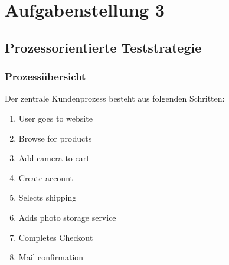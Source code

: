 \newpage
\section{Aufgabenstellung 3}




\subsection{Prozessorientierte Teststrategie}
\subsubsection{Prozessübersicht}
Der zentrale Kundenprozess besteht aus folgenden Schritten:
\begin{enumerate}
\item User goes to website
\item Browse for products
\item Add camera to cart
\item Create account
\item Selects shipping
\item Adds photo storage service
\item Completes Checkout
\item Mail confirmation
\end{enumerate}
